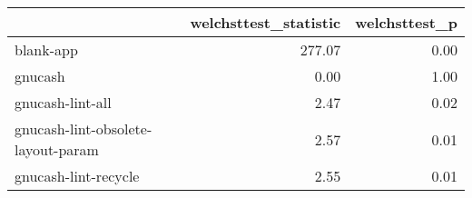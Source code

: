 \begin{tabular}{lrr}
\toprule
{} &  welchsttest\_statistic &  welchsttest\_p \\
\midrule
blank-app                          &                 277.07 &           0.00 \\
gnucash                            &                   0.00 &           1.00 \\
gnucash-lint-all                   &                   2.47 &           0.02 \\
gnucash-lint-obsolete-layout-param &                   2.57 &           0.01 \\
gnucash-lint-recycle               &                   2.55 &           0.01 \\
\bottomrule
\end{tabular}
